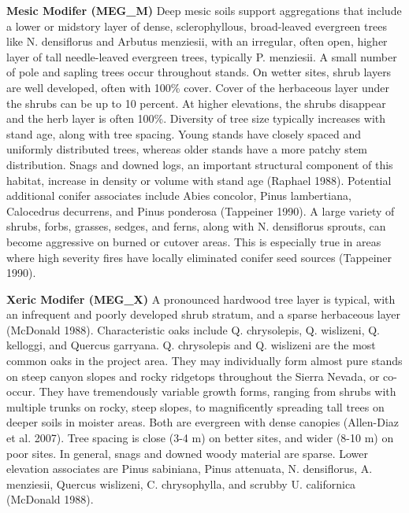 \begin{adjustwidth}{2cm}{}
\textbf{Mesic Modifer (MEG\_M)}
Deep mesic soils support aggregations that include a lower or midstory layer of dense, sclerophyllous, broad-leaved evergreen trees like N. densiflorus and Arbutus menziesii, with an irregular, often open, higher layer of tall needle-leaved evergreen trees, typically P. menziesii. A small number of pole and sapling trees occur throughout stands. On wetter sites, shrub layers are well developed, often with 100\% cover. Cover of the herbaceous layer under the shrubs can be up to 10 percent. At higher elevations, the shrubs disappear and the herb layer is often 100\%. Diversity of tree size typically increases with stand age, along with tree spacing. Young stands have closely spaced and uniformly distributed trees, whereas older stands have a more patchy stem distribution. Snags and downed logs, an important structural component of this habitat, increase in density or volume with stand age (Raphael 1988). Potential additional conifer associates include Abies concolor, Pinus lambertiana, Calocedrus decurrens, and Pinus ponderosa (Tappeiner 1990). A large variety of shrubs, forbs, grasses, sedges, and ferns, along with N. densiflorus sprouts, can become aggressive on burned or cutover areas. This is especially true in areas where high severity fires have locally eliminated conifer seed sources (Tappeiner 1990).

\medskip
\noindent \textbf{Xeric Modifer (MEG\_X)}
A pronounced hardwood tree layer is typical, with an infrequent and poorly developed shrub stratum, and a sparse herbaceous layer (McDonald 1988). Characteristic oaks include Q. chrysolepis, Q. wislizeni, Q. kelloggi, and Quercus garryana. Q. chrysolepis and Q. wislizeni are the most common oaks in the project area. They may individually form almost pure stands on steep canyon slopes and rocky ridgetops throughout the Sierra Nevada, or co-occur. They have tremendously variable growth forms, ranging from shrubs with multiple trunks on rocky, steep slopes, to magnificently spreading tall trees on deeper soils in moister areas. Both are evergreen with dense canopies (Allen-Diaz et al. 2007). Tree spacing is close (3-4 m) on better sites, and wider (8-10 m) on poor sites. In general, snags and downed woody material are sparse. Lower elevation associates are Pinus sabiniana, Pinus attenuata, N. densiflorus, A. menziesii, Quercus wislizeni, C. chrysophylla, and scrubby U. californica (McDonald 1988).


\end{adjustwidth}
